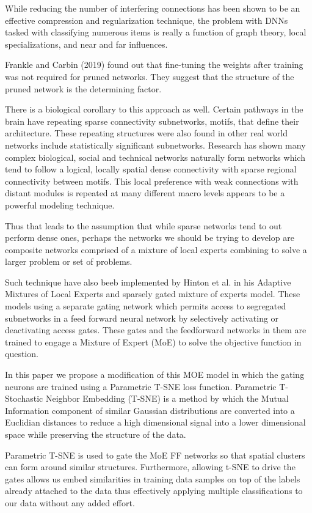 \documentclass{llncs}
\begin{document}
While reducing the number of interfering connections has been shown to be an effective
compression and regularization technique, the problem with DNNs tasked with classifying
numerous items is really a function of graph theory, local specializations, and near and
far influences.

Frankle and Carbin (2019) found out that fine-tuning the weights after training was not
required for pruned networks.  They suggest that the structure of the pruned network is
the determining factor.

There is a biological corollary to this approach as well.  Certain pathways in the brain
have repeating sparse connectivity subnetworks, motifs, that define their architecture.
These repeating structures were also found in other real world networks include
statistically significant subnetworks. Research has shown many complex biological,
social and technical networks naturally form networks which tend to follow a logical,
locally spatial dense connectivity with sparse regional connectivity between motifs.
This local preference with weak connections with distant modules is repeated at many
different macro levels appears to be a powerful modeling technique.

Thus that leads to the assumption that while sparse networks tend to out perform dense
ones, perhaps the networks we should be trying to develop are composite networks
comprised of a mixture of local experts combining to solve a larger problem or set of problems.

Such technique have also beeb implemented by Hinton et al. in his Adaptive Mixtures of
Local Experts and sparsely gated mixture of experts model.  These models using a separate
gating network which permits access to segregated subnetworks in a feed forward neural
network by selectively activating or deactivating access gates.  These gates and the
feedforward networks in them are trained to engage  a Mixture of Expert (MoE) to solve
the objective function in question.

In this paper we propose a modification of this MOE model in which the gating neurons are
trained using a Parametric T-SNE loss function. Parametric T-Stochastic Neighbor Embedding
(T-SNE) is a method by which the Mutual Information component of similar Gaussian
distributions are converted into a Euclidian distances to reduce a high dimensional signal
into a lower dimensional space while preserving the structure of the data.

Parametric T-SNE is used to gate the MoE FF networks so that spatial clusters can form
around similar structures.  Furthermore, allowing t-SNE to drive the gates allows us embed
similarities in training data samples on top of the labels already attached to the data
thus effectively applying multiple classifications to our data without any added effort.
\end{document}
